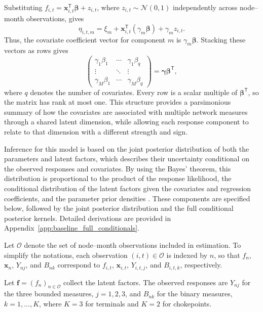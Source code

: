 \documentclass[pdftex,12pt,openright,a4paper,oneside]{book}
\begin{document}
Substituting
$f_{i,t}=\boldsymbol{x}_{i,t}^{\mathsf T}
\boldsymbol{\beta}+z_{i,t}$,
where $z_{i,t}\sim\mathcal{N}(0,1)$ independently across
node--month observations, gives
\begin{equation}
\eta_{i,t,m}
=
\xi_m+
\boldsymbol{x}_{i,t}^{\mathsf T}
(\gamma_m\boldsymbol{\beta})
+\gamma_m z_{i,t}.
\end{equation}
Thus, the covariate coefficient vector for component
$m$ is $\gamma_m\boldsymbol{\beta}$.
Stacking these vectors as rows gives
\begin{equation*}
\begin{pmatrix}
\gamma_1\beta_1 & \cdots & \gamma_1\beta_q\\
\vdots & \ddots & \vdots\\
\gamma_M\beta_1 & \cdots & \gamma_M\beta_q
\end{pmatrix}
=
\boldsymbol{\gamma}\boldsymbol{\beta}^{\mathsf T},
\end{equation*}
where $q$ denotes the number of covariates.
Every row is a scalar multiple of
$\boldsymbol{\beta}^{\mathsf T}$, so the matrix has
rank at most one.
This structure provides a parsimonious summary of how
the covariates are associated with multiple network
measures through a shared latent dimension, while
allowing each response component to relate to that
dimension with a different strength and sign.

Inference for this model is based on the joint posterior
distribution of both the parameters and latent factors,
which describes their uncertainty conditional on the
observed responses and covariates. By using the Bayes' theorem,
this distribution is proportional to the product of
the response likelihood, the conditional distribution
of the latent factors given the covariates and regression
coefficients, and the parameter prior densities
\citep{gelman2013bayesian}.
These components are specified below, followed by the
joint posterior distribution and the full conditional
posterior kernels. Detailed derivations are provided in
Appendix~\ref{app:baseline_full_conditionals}.

Let $\mathcal{O}$ denote the set of node--month observations
included in estimation. To simplify the notations, each
observation $(i,t)\in\mathcal{O}$ is indexed by $n$, so that
$f_n$, $\boldsymbol{x}_n$, $Y_{nj}$, and $B_{nk}$ correspond
to $f_{i,t}$, $\boldsymbol{x}_{i,t}$, $Y_{i,t,j}$, and
$B_{i,t,k}$, respectively. 

Let $\mathbf{f}=(f_n)_{n\in\mathcal{O}}$ collect the latent
factors. The observed responses are $Y_{nj}$ for the three
bounded measures, $j=1,2,3$, and $B_{nk}$ for the binary
measures, $k=1,\ldots,K$, where $K=3$ for terminals and
$K=2$ for chokepoints.
\end{document}
